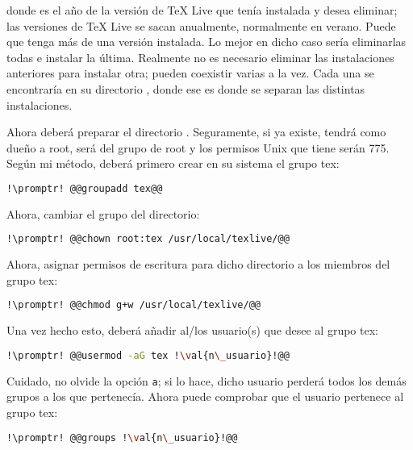 \noindent donde  es el año de la versión de \TeX{} Live que tenía instalada y desea eliminar; las
versiones de \TeX{} Live se sacan anualmente, normalmente en verano. Puede que tenga más de una versión
instalada. Lo mejor en dicho caso sería eliminarlas todas e instalar la última. Realmente no es necesario
eliminar las instalaciones anteriores para instalar otra; pueden coexistir varias a la vez. Cada una se
encontraría en su directorio , donde ese  es donde se separan las
distintas instalaciones.

Ahora deberá preparar el directorio . Seguramente, si ya existe, tendrá como dueño a
root, será del grupo de root y los permisos Unix que tiene serán 775. Según mi método, deberá primero crear en
su sistema el grupo tex:

\begin{lstlisting}[gobble=2,language=bash,style=bashinteract,escapechar=!]
  !\promptr! @@groupadd tex@@
\end{lstlisting}

\noindent Ahora, cambiar el grupo del directorio:

\begin{lstlisting}[gobble=2,language=bash,style=bashinteract,escapechar=!]
  !\promptr! @@chown root:tex /usr/local/texlive/@@
\end{lstlisting}

\noindent Ahora, asignar permisos de escritura para dicho directorio a los miembros del grupo tex:

\begin{lstlisting}[gobble=2,language=bash,style=bashinteract,escapechar=!]
  !\promptr! @@chmod g+w /usr/local/texlive/@@
\end{lstlisting}

Una vez hecho esto, deberá añadir al/los usuario(s) que desee al grupo tex:

\begin{lstlisting}[gobble=2,language=bash,style=bashinteract,escapechar=!]
  !\promptr! @@usermod -aG tex !\val{n\_usuario}!@@
\end{lstlisting}

\noindent Cuidado, no olvide la opción \lstinline!a!; si lo hace, dicho usuario perderá todos los demás grupos a
los que pertenecía. Ahora puede comprobar que el usuario  pertenece al grupo tex:

\begin{lstlisting}[gobble=2,language=bash,style=bashinteract,escapechar=!]
  !\promptr! @@groups !\val{n\_usuario}!@@
\end{lstlisting}

